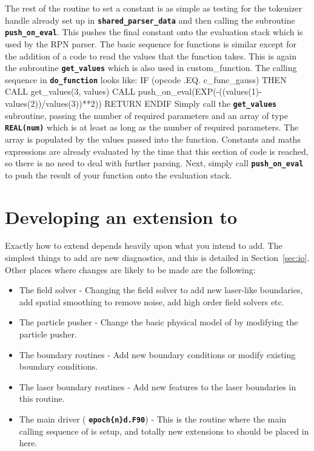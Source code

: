 \documentclass[12pt,a4paper]{article}
\newcommand{\inlinecode}[1]{{\color{warwickred} \bf\texttt{#1}}}
\newcommand{\sect}[1]{Section~\ref{sec:#1}}
\newcommand{\EPOCH}{{\color{warwickdark}\fontfamily{phv}\selectfont{EPOCH}}}
\newenvironment{boxverbatim}{\lboxverbatim{none}}{\endlboxverbatim}
\begin{document}
The rest of the routine to set a constant is as simple as testing for the
tokenizer handle already set up in \inlinecode{shared\_parser\_data} and then
calling the subroutine \inlinecode{push\_on\_eval}. This pushes the final
constant onto the evaluation stack which is used by the RPN parser. The basic
sequence for functions is similar except for the addition of a code to read
the values that the function takes. This is again the subroutine
\inlinecode{get\_values} which is also used in custom\_function. The calling
sequence in \inlinecode{do\_function} looks like:
\begin{boxverbatim}
  IF (opcode .EQ. c_func_gauss) THEN
    CALL get_values(3, values)
    CALL push_on_eval(EXP(-((values(1)-values(2))/values(3))**2))
    RETURN
  ENDIF
\end{boxverbatim}
Simply call the \inlinecode{get\_values} subroutine, passing the number of
required parameters and an array of type \inlinecode{REAL(num)} which is at
least as long as the number of required parameters. The array is populated
by the values passed into the function. Constants and maths expressions are
already evaluated by the time that this section of code is reached, so there is
no need to deal with further parsing. Next, simply call
\inlinecode{push\_on\_eval} to push the result of your function onto the
evaluation stack.

\section{Developing an extension to {\EPOCH}}
\label{sec:extend}

Exactly how to extend {\EPOCH} depends heavily upon what you intend to add. The
simplest things to add are new diagnostics, and this is detailed in
\sect{io}. Other places where changes are likely to be made
are the following:
\begin{itemize}
\item The field solver - Changing the field solver to add new laser-like
  boundaries, add spatial smoothing to remove noise, add high order field
  solvers etc.
\item The particle pusher - Change the basic physical model of {\EPOCH} by
  modifying the particle pusher.
\item The boundary routines - Add new boundary conditions or modify existing
  boundary conditions.
\item The laser boundary routines - Add new features to the laser boundaries in
  this routine.
\item The main driver (\inlinecode{epoch\{n\}d.F90}) - This is the routine
  where the main calling sequence of {\EPOCH} is setup, and totally new
  extensions to {\EPOCH} should be placed in here.
\end{itemize}
\end{document}
